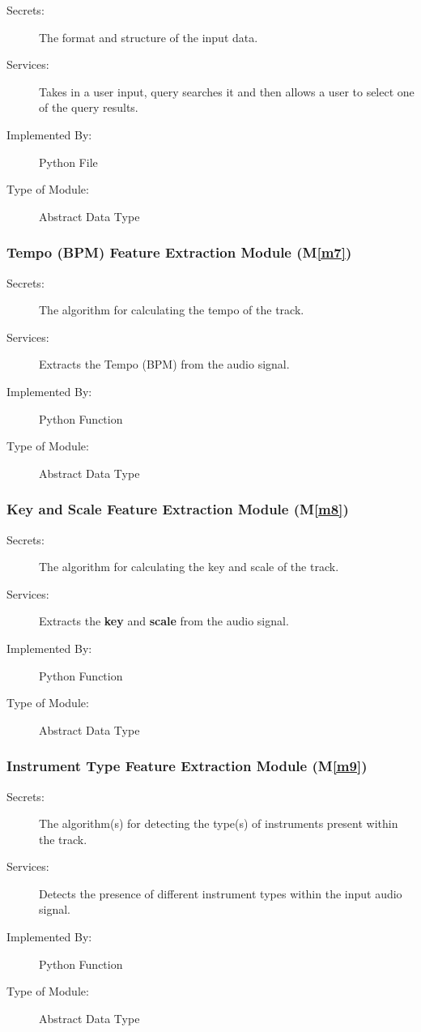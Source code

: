 \documentclass[12pt, titlepage]{article}
\newcommand{\mref}[1]{M\ref{#1}}
\begin{document}
\begin{description}
\item[Secrets:] The format and structure of the input data.
\item[Services:] Takes in a user input, query searches it and then allows a user to select one of the query results. 
\item[Implemented By:] Python File
\item[Type of Module:] Abstract Data Type
\end{description}

\subsubsection{Tempo (BPM) Feature Extraction Module (\mref{m7})}

\begin{description}
\item[Secrets:] The algorithm for calculating the tempo of the track. 
\item[Services:] Extracts the Tempo (BPM) from the audio signal. 
\item[Implemented By:] Python Function
\item[Type of Module:] Abstract Data Type
\end{description}

\subsubsection{Key and Scale Feature Extraction Module (\mref{m8})}

\begin{description}
\item[Secrets:] The algorithm for calculating the key and scale of the track. 
\item[Services:]Extracts the \textbf{key} and \textbf{scale} from the audio signal. 
\item[Implemented By:] Python Function
\item[Type of Module:] Abstract Data Type
\end{description}

\subsubsection{Instrument Type Feature Extraction Module (\mref{m9})}

\begin{description}
\item[Secrets:] The algorithm(s) for detecting the type(s) of instruments present within the track. 
\item[Services:]Detects the presence of different instrument types within the input audio signal. 
\item[Implemented By:] Python Function
\item[Type of Module:] Abstract Data Type
\end{description}
\end{document}
